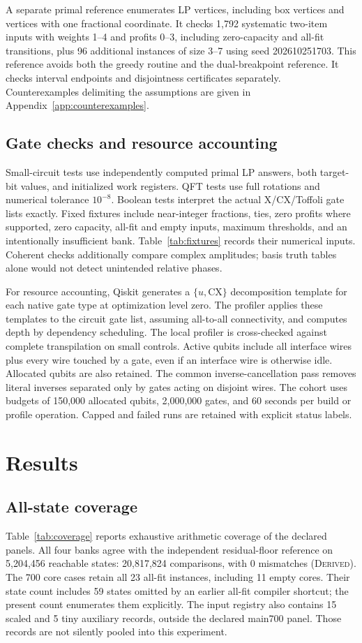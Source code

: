 \documentclass[referee,pdflatex,sn-mathphys-num]{sn-jnl}
\theoremstyle{thmstyleone}
\theoremstyle{thmstyletwo}
\begin{document}
A separate primal reference enumerates LP vertices, including box vertices and vertices with one fractional coordinate. It checks 1,792 systematic two-item inputs with weights 1--4 and profits 0--3, including zero-capacity and all-fit transitions, plus 96 additional instances of size 3--7 using seed 202610251703. This reference avoids both the greedy routine and the dual-breakpoint reference. It checks interval endpoints and disjointness certificates separately. Counterexamples delimiting the assumptions are given in Appendix~\ref{app:counterexamples}.

\subsection{Gate checks and resource accounting}
Small-circuit tests use independently computed primal LP answers, both target-bit values, and initialized work registers. QFT tests use full rotations and numerical tolerance $10^{-8}$. Boolean tests interpret the actual X/CX/Toffoli gate lists exactly. Fixed fixtures include near-integer fractions, ties, zero profits where supported, zero capacity, all-fit and empty inputs, maximum thresholds, and an intentionally insufficient bank. Table~\ref{tab:fixtures} records their numerical inputs. Coherent checks additionally compare complex amplitudes; basis truth tables alone would not detect unintended relative phases.

For resource accounting, Qiskit generates a $\{u,\mathrm{CX}\}$ decomposition template for each native gate type at optimization level zero. The profiler applies these templates to the circuit gate list, assuming all-to-all connectivity, and computes depth by dependency scheduling. The local profiler is cross-checked against complete transpilation on small controls. Active qubits include all interface wires plus every wire touched by a gate, even if an interface wire is otherwise idle. Allocated qubits are also retained. The common inverse-cancellation pass removes literal inverses separated only by gates acting on disjoint wires. The cohort uses budgets of 150,000 allocated qubits, 2,000,000 gates, and 60 seconds per build or profile operation. Capped and failed runs are retained with explicit status labels.

\section{Results}\label{sec:results}
\subsection{All-state coverage}
Table~\ref{tab:coverage} reports exhaustive arithmetic coverage of the declared panels. All four banks agree with the independent residual-floor reference on 5,204,456 reachable states: 20,817,824 comparisons, with 0 mismatches (\textsc{Derived}). The 700 core cases retain all 23 all-fit instances, including 11 empty cores. Their state count includes 59 states omitted by an earlier all-fit compiler shortcut; the present count enumerates them explicitly. The input registry also contains 15 scaled and 5 tiny auxiliary records, outside the declared main700 panel. Those records are not silently pooled into this experiment.
\end{document}
